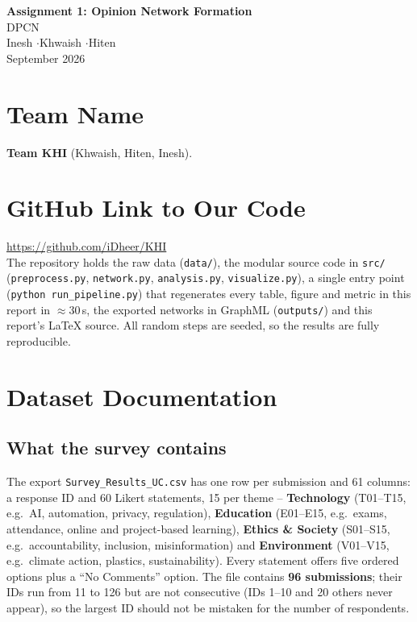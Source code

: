 \documentclass[11pt,a4paper]{article}
\begin{document}
{\centering
{\LARGE\bfseries Assignment 1: Opinion Network Formation}\\[4pt]
{\large DPCN}\\[2pt]
{\normalsize Inesh \quad$\cdot$\quad Khwaish \quad$\cdot$\quad Hiten}\\[2pt]
{\small September 2026}\par}
\vspace{6pt}

\section{Team Name}
\textbf{Team KHI} (Khwaish, Hiten, Inesh).

\section{GitHub Link to Our Code}
\url{https://github.com/iDheer/KHI}\\
The repository holds the raw data (\texttt{data/}), the modular source code in \texttt{src/}
(\texttt{preprocess.py}, \texttt{network.py}, \texttt{analysis.py}, \texttt{visualize.py}), a single entry point
(\texttt{python run\_pipeline.py}) that regenerates every table, figure and metric in this report in
$\approx$30\,s, the exported networks in GraphML (\texttt{outputs/}) and this report's \LaTeX{} source.
All random steps are seeded, so the results are fully reproducible.

\section{Dataset Documentation}
\subsection{What the survey contains}
The export \texttt{Survey\_Results\_UC.csv} has one row per submission and 61 columns: a response
ID and 60 Likert statements, 15 per theme -- \textbf{Technology} (T01--T15, e.g.\ AI, automation,
privacy, regulation), \textbf{Education} (E01--E15, e.g.\ exams, attendance, online and project-based
learning), \textbf{Ethics \& Society} (S01--S15, e.g.\ accountability, inclusion, misinformation) and
\textbf{Environment} (V01--V15, e.g.\ climate action, plastics, sustainability). Every statement offers
five ordered options plus a ``No Comments'' option. The file contains \textbf{96 submissions}; their IDs
run from 11 to 126 but are not consecutive (IDs 1--10 and 20 others never appear), so the largest ID should
not be mistaken for the number of respondents.
\end{document}
